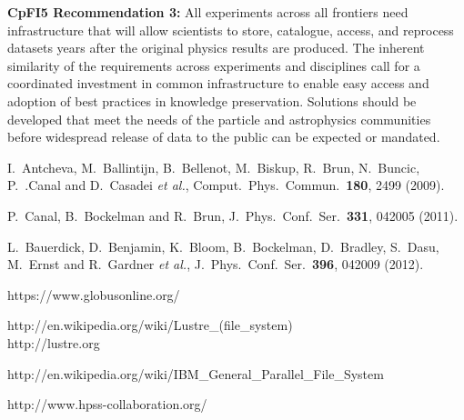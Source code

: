 {\bf CpFI5 Recommendation 3:} All experiments across all frontiers need 
infrastructure that will allow scientists to store, catalogue, access, and 
reprocess datasets years after the original physics results are produced. 
The inherent similarity of the requirements across experiments and disciplines 
call for a coordinated investment in common infrastructure to enable easy 
access and adoption of best practices in knowledge preservation.  Solutions 
should be developed that meet the needs of the particle and astrophysics 
communities before widespread release of data to the public can be expected 
or mandated.


\begin{thebibliography}{99}


  I.~Antcheva, M.~Ballintijn, B.~Bellenot, M.~Biskup, R.~Brun, N.~Buncic, P.~.Canal and D.~Casadei {\it et al.},
  Comput.\ Phys.\ Commun.\  {\bf 180}, 2499 (2009).

  P.~Canal, B.~Bockelman and R.~Brun,
  J.\ Phys.\ Conf.\ Ser.\  {\bf 331}, 042005 (2011).

  L.~Bauerdick, D.~Benjamin, K.~Bloom, B.~Bockelman, D.~Bradley, S.~Dasu, M.~Ernst and R.~Gardner {\it et al.},
  J.\ Phys.\ Conf.\ Ser.\  {\bf 396}, 042009 (2012).

  https://www.globusonline.org/

  http://en.wikipedia.org/wiki/Lustre\_(file\_system) \\
  http://lustre.org

  http://en.wikipedia.org/wiki/IBM\_General\_Parallel\_File\_System

  http://www.hpss-collaboration.org/


\end{thebibliography}


